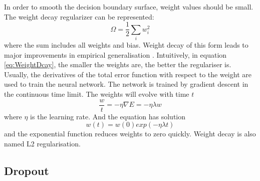 In order to smooth the decision boundary surface, weight values should be small. The weight decay regularizer can be represented:
\begin{equation}\label{eq:WeightDcay}
\Omega = \frac{1}{2} \sum_i w_{i}^2
\end{equation}
where the sum includes all weights and bias. Weight decay of this form leads to major improvements in empirical generalisation \citep{hinton1987learning}. Intuitively, in equation \ref{eq:WeightDcay}, the smaller the weights are, the better the regulariser is. Usually, the derivatives of the total error function with respect to the weight are used to train the neural network. The network is trained by gradient descent in the continuous time limit. The weights will evolve with time $t$
\begin{equation}\label{eq:WeightDecayTime}
\frac{w}{t} = -\eta\nabla E = -\eta\lambda w
\end{equation}
where $\eta$ is the learning rate. And the equation has solution
\begin{equation}\label{eq:WeightDecaySolution}
w(t) = w(0)exp(-\eta\lambda t)
\end{equation}
and the exponential function reduces weights to zero quickly. Weight decay is also named L2 regularisation.

\subsection{Dropout}

